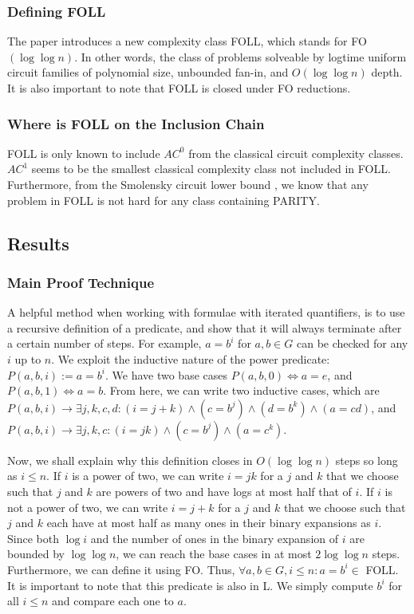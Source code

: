 \documentclass[a4paper,12pt]{article}
\theoremstyle{plain}
\theoremstyle{definition}
\theoremstyle{remark}
\begin{document}
\subsubsection{Defining FOLL}
The paper introduces a new complexity class FOLL, which stands for FO$(\log\log n)$. In other words, the class of problems solveable by logtime uniform circuit families of polynomial size, unbounded fan-in, and $O(\log\log n)$ depth. It is also important to note that FOLL is closed under FO reductions.

\subsubsection{Where is FOLL on the Inclusion Chain}
FOLL is only known to include $AC^0$ from the classical circuit complexity classes. $AC^1$ seems to be the smallest classical complexity class not included in FOLL. Furthermore, from the Smolensky circuit lower bound \cite{Smolensky1993OnRB}, we know that any problem in FOLL is not hard for any class containing PARITY.

\subsection{Results}
\subsubsection{Main Proof Technique}
A helpful method when working with formulae with iterated quantifiers, is to use a recursive definition of a predicate, and show that it will always terminate after a certain number of steps. For example, $a=b^i$ for $a,b\in G$ can be checked for any $i$ up to $n$. We exploit the inductive nature of the power predicate: $P(a,b,i):=a=b^i$. We have two base cases $P(a,b,0)\iff a=e$, and $P(a,b,1)\iff a=b$. From here, we can write two inductive cases, which are $P(a,b,i)\to\exists j,k,c,d: (i=j+k)\land(c=b^j)\land(d=b^k)\land(a=cd)$, and $P(a,b,i)\to\exists j,k,c:(i=jk)\land(c=b^j)\land(a=c^k)$. \vspace{\baselineskip} 

Now, we shall explain why this definition closes in $O(\log\log n)$ steps so long as $i\leq n$. If $i$ is a power of two, we can write $i=jk$ for a $j$ and $k$ that we choose such that $j$ and $k$ are powers of two and have logs at most half that of $i$. If $i$ is not a power of two, we can write $i=j+k$ for a $j$ and $k$ that we choose such that $j$ and $k$ each have at most half as many ones in their binary expansions as $i$. Since both $\log i$ and the number of ones in the binary expansion of $i$ are bounded by $\log\log n$, we can reach the base cases in at most $2\log\log n$ steps. Furthermore, we can define it using FO. Thus, $\forall a,b\in G,i\leq n: a=b^i\in$ FOLL. It is important to note that this predicate is also in L. We simply compute $b^i$ for all $i\leq n$ and compare each one to $a$.
\end{document}
